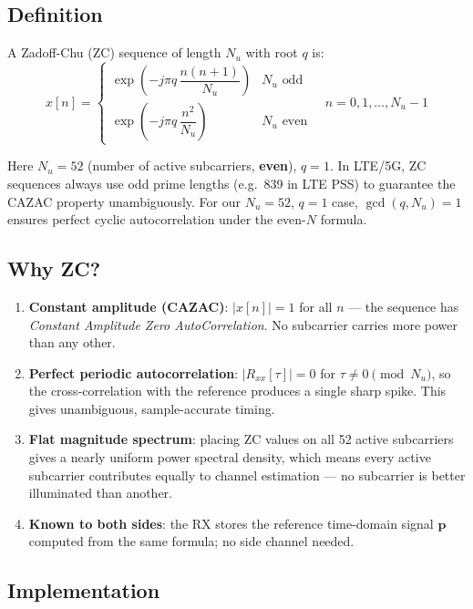 \documentclass[11pt,a4paper]{article}
\begin{document}
\subsection{Definition}

A Zadoff-Chu (ZC) sequence of length $N_u$ with root $q$ is:
\begin{equation}
  x[n] = \begin{cases}
    \exp\!\left(-j\pi q\,\dfrac{n(n+1)}{N_u}\right) & N_u \text{ odd} \\[8pt]
    \exp\!\left(-j\pi q\,\dfrac{n^2}{N_u}\right)     & N_u \text{ even}
  \end{cases}
  \quad n = 0,1,\ldots,N_u-1
\end{equation}

Here $N_u = 52$ (number of active subcarriers, \textbf{even}), $q = 1$.
In LTE/5G, ZC sequences always use odd prime lengths (e.g.\ 839 in LTE PSS)
to guarantee the CAZAC property unambiguously.  For our $N_u=52$, $q=1$
case, $\gcd(q, N_u)=1$ ensures perfect cyclic autocorrelation under the
even-$N$ formula.

\subsection{Why ZC?}

\begin{enumerate}
  \item \textbf{Constant amplitude (CAZAC)}: $|x[n]| = 1$ for all $n$ ---
        the sequence has \emph{Constant Amplitude Zero AutoCorrelation}.
        No subcarrier carries more power than any other.
  \item \textbf{Perfect periodic autocorrelation}: $|R_{xx}[\tau]| = 0$ for
        $\tau \neq 0 \pmod{N_u}$, so the cross-correlation with the reference
        produces a single sharp spike.  This gives unambiguous, sample-accurate
        timing.
  \item \textbf{Flat magnitude spectrum}: placing ZC values on all 52 active
        subcarriers gives a nearly uniform power spectral density, which means
        every active subcarrier contributes equally to channel estimation ---
        no subcarrier is better illuminated than another.
  \item \textbf{Known to both sides}: the RX stores the reference time-domain
        signal $\mathbf{p}$ computed from the same formula; no side channel
        needed.
\end{enumerate}

\subsection{Implementation}
\end{document}
